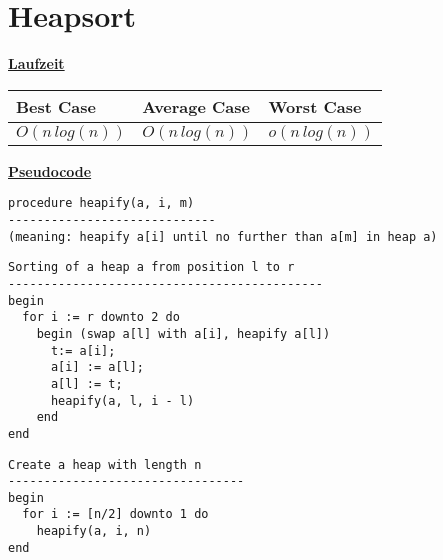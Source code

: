 \documentclass[a4paper]{report}
\begin{document}
\chapter*{Heapsort}

\underline{\bf{Laufzeit}}

\begin{tabular}{|l|l|l|}
\hline
Best Case    & Average Case  &  Worst Case\\ \hline
$O(n\,log(n))$ & $O(n\,log(n))$  &  $o(n\,log(n))$  \\ \hline
\end{tabular}

\underline{\bf{Pseudocode}}

\begin{lstlisting}
procedure heapify(a, i, m)
-----------------------------
(meaning: heapify a[i] until no further than a[m] in heap a)
\end{lstlisting}

\begin{lstlisting}
Sorting of a heap a from position l to r
--------------------------------------------
begin
  for i := r downto 2 do
    begin (swap a[l] with a[i], heapify a[l])
      t:= a[i];
      a[i] := a[l];
      a[l] := t; 
      heapify(a, l, i - l)
    end
end
\end{lstlisting}

\begin{lstlisting}
Create a heap with length n
---------------------------------
begin
  for i := [n/2] downto 1 do
    heapify(a, i, n)
end
\end{lstlisting}
\end{document}
